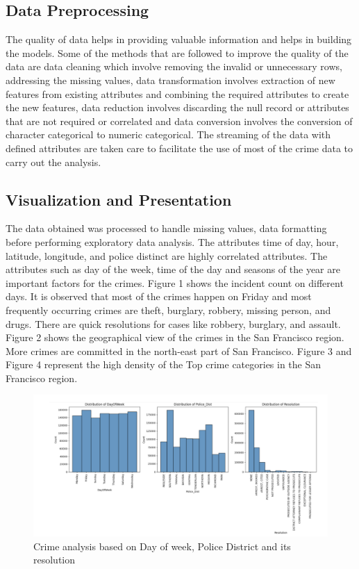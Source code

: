 \documentclass[conference,final,]{IEEEtran}
\begin{document}
\subsection{Data Preprocessing}\label{data-preprocessing}

The quality of data helps in providing valuable information and helps in
building the models. Some of the methods that are followed to improve
the quality of the data are data cleaning which involve removing the
invalid or unnecessary rows, addressing the missing values, data
transformation involves extraction of new features from existing
attributes and combining the required attributes to create the new
features, data reduction involves discarding the null record or
attributes that are not required or correlated and data conversion
involves the conversion of character categorical to numeric categorical.
The streaming of the data with defined attributes are taken care to
facilitate the use of most of the crime data to carry out the analysis.

\subsection{Visualization and
Presentation}\label{visualization-and-presentation}

The data obtained was processed to handle missing values, data
formatting before performing exploratory data analysis. The attributes
time of day, hour, latitude, longitude, and police distinct are highly
correlated attributes. The attributes such as day of the week, time of
the day and seasons of the year are important factors for the crimes.
Figure 1 shows the incident count on different days. It is observed that
most of the crimes happen on Friday and most frequently occurring crimes
are theft, burglary, robbery, missing person, and drugs. There are quick
resolutions for cases like robbery, burglary, and assault. Figure 2
shows the geographical view of the crimes in the San Francisco region.
More crimes are committed in the north-east part of San Francisco.
Figure 3 and Figure 4 represent the high density of the Top crime
categories in the San Francisco region.

\begin{figure}

{\centering \includegraphics[width=0.5\linewidth]{img/fig1} 

}

\caption{Crime analysis based on Day of week, Police District and its resolution}\label{fig:unnamed-chunk-1}
\end{figure}
\end{document}
